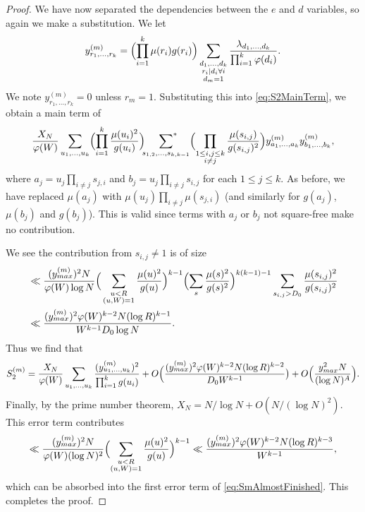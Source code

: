 \documentclass[12pt,a4paper]{amsart}
\theoremstyle{plain}
\numberwithin{sblmm}{thrm}
\numberwithin{equation}{section}
\renewcommand{\phi}{\varphi}
\begin{document}
\begin{proof}
We have now separated the dependencies between the $e$ and $d$ variables, so again we make a substitution. We let
\begin{equation}
y^{(m)}_{r_1,\dotsc,r_k}=\Bigl(\prod_{i=1}^k \mu(r_i)g(r_i)\Bigr)\sum_{\substack{d_1,\dotsc, d_{k}\\ r_i|d_i\forall i\\ d_m=1}}\frac{\lambda_{d_1,\dotsc,d_k}}{\prod_{i=1}^k\phi(d_i)}.\label{eq:YjDef}
\end{equation}
We note $y^{(m)}_{r_1,\dotsc,r_k}=0$ unless $r_m=1$. Substituting this into \eqref{eq:S2MainTerm}, we obtain a main term of
\begin{equation}
\frac{X_N}{\phi(W)}\sum_{u_1,\dotsc,u_k}\Bigl(\prod_{i=1}^k\frac{\mu(u_i)^2}{g(u_i)}\Bigr)\sideset{}{^*}\sum_{s_{1,2},\dotsc,s_{k,k-1}}\Bigl(\prod_{\substack{1\le i,j\le k\\ i\ne j}}\frac{\mu(s_{i,j})}{g(s_{i,j})^2}\Bigr)y^{(m)}_{a_1,\dotsc,a_k}y^{(m)}_{b_1,\dotsc,b_k},
\end{equation}
where $a_j=u_j\prod_{i\ne j}s_{j,i}$ and $b_j=u_j\prod_{i\ne j}s_{i,j}$ for each $1\le j\le k$. As before, we have replaced  $\mu(a_j)$ with $\mu(u_j)\prod_{i\ne j}\mu(s_{j,i})$ (and similarly for $g(a_j)$, $\mu(b_j)$ and $g(b_j)$). This is valid since terms with $a_j$ or $b_j$ not square-free make no contribution.

We see the contribution from $s_{i,j}\ne 1$ is of size
\begin{align}
&\ll \frac{(y^{(m)}_{max})^2 N}{\phi(W)\log{N}}\Bigr(\sum_{\substack{u<R\\(u,W)=1}}\frac{\mu(u)^2}{g(u)}\Bigr)^{k-1}\Bigl(\sum_{s}\frac{\mu(s)^2}{g(s)^2}\Bigr)^{k(k-1)-1}\sum_{s_{i,j}>D_0}\frac{\mu(s_{i,j})^2}{g(s_{i,j})^2}\nonumber\\
&\ll \frac{(y^{(m)}_{max})^2 \phi(W)^{k-2} N (\log{R})^{k-1}}{W^{k-1} D_0 \log{N}}.
\end{align}
Thus we find that
\begin{equation}
S_2^{(m)}=\frac{X_N}{\phi(W)}\sum_{u_1,\dotsc,u_k}\frac{(y^{(m)}_{u_1,\dotsc,u_k})^2}{\prod_{i=1}^kg(u_i)}+O\Bigl(\frac{(y_{max}^{(m)})^2 \phi(W)^{k-2} N (\log{R})^{k-2}}{D_0W^{k-1}}\bigr)+O\Bigl(\frac{y_{max}^2N}{(\log{N})^A}\Bigr).\label{eq:SmAlmostFinished}
\end{equation}
Finally, by the prime number theorem, $X_N=N/\log{N}+O(N/(\log{N})^2)$. This error term contributes
\begin{equation}
\ll \frac{(y^{(m)}_{max})^2 N}{\phi(W)(\log{N})^2}\Bigl(\sum_{\substack{u<R\\ (u,W)=1}}\frac{\mu(u)^2}{g(u)}\Bigr)^{k-1}\ll \frac{(y^{(m)}_{max})^2 \phi(W)^{k-2} N (\log{R})^{k-3}}{W^{k-1}},
\end{equation}
which can be absorbed into the first error term of \eqref{eq:SmAlmostFinished}. This completes the proof.
\end{proof}
\end{document}
